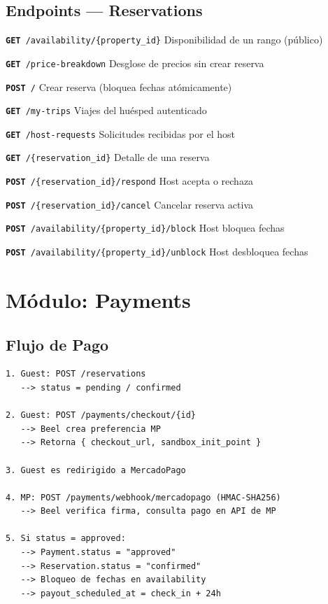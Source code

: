 \documentclass[12pt,a4paper]{report}
\newcommand{\apiendpoint}[3]{%
  \noindent\texttt{\textcolor{beelprimary}{\textbf{#1}}\ \textcolor{beeltier}{#2}}%
  \hfill\textcolor{beelgray}{\small #3}\par\smallskip
}
\begin{document}
\subsection{Endpoints --- Reservations}

\begin{tcolorbox}[beelinfo, title={/api/v1/reservations}]
\apiendpoint{GET}{/availability/\{property\_id\}}{Disponibilidad de un rango (p\'ublico)}
\apiendpoint{GET}{/price-breakdown}{Desglose de precios sin crear reserva}
\apiendpoint{POST}{/}{Crear reserva (bloquea fechas at\'omicamente)}
\apiendpoint{GET}{/my-trips}{Viajes del hu\'esped autenticado}
\apiendpoint{GET}{/host-requests}{Solicitudes recibidas por el host}
\apiendpoint{GET}{/\{reservation\_id\}}{Detalle de una reserva}
\apiendpoint{POST}{/\{reservation\_id\}/respond}{Host acepta o rechaza}
\apiendpoint{POST}{/\{reservation\_id\}/cancel}{Cancelar reserva activa}
\apiendpoint{POST}{/availability/\{property\_id\}/block}{Host bloquea fechas}
\apiendpoint{POST}{/availability/\{property\_id\}/unblock}{Host desbloquea fechas}
\end{tcolorbox}

\section{M\'odulo: Payments}

\subsection{Flujo de Pago}

\begin{tcolorbox}[beelinfo, title={Flujo MercadoPago}]
\begin{lstlisting}[numbers=none, frame=none, xleftmargin=0pt]
1. Guest: POST /reservations
   --> status = pending / confirmed

2. Guest: POST /payments/checkout/{id}
   --> Beel crea preferencia MP
   --> Retorna { checkout_url, sandbox_init_point }

3. Guest es redirigido a MercadoPago

4. MP: POST /payments/webhook/mercadopago (HMAC-SHA256)
   --> Beel verifica firma, consulta pago en API de MP

5. Si status = approved:
   --> Payment.status = "approved"
   --> Reservation.status = "confirmed"
   --> Bloqueo de fechas en availability
   --> payout_scheduled_at = check_in + 24h
\end{lstlisting}
\end{tcolorbox}
\end{document}
